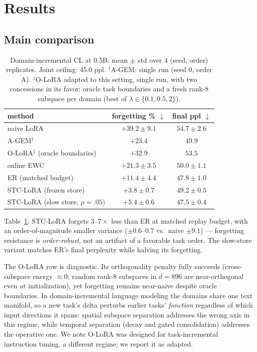 \documentclass{article}
\newcommand{\stc}{STC-LoRA}
\newcommand{\best}[1]{\bm{#1}}   %
\begin{document}
\section{Results}\label{sec:results}

\subsection{Main comparison}
\begin{table}[t]
\centering\small
\caption{Domain-incremental CL at 0.5B: mean $\pm$ std over 4 (seed, order) replicates. Joint ceiling: 45.0 ppl. $^{\dagger}$A-GEM: single run (seed 0, order A). $^{\ddagger}$O-LoRA \citep{wang2023orthogonal} adapted to this setting, single run, with two concessions in its favor: oracle task boundaries and a fresh rank-8 subspace per domain (best of $\lambda\in\{0.1,0.5,2\}$).}
\label{tab:main}
\begin{tabular}{lcc}
\toprule
method & forgetting \% $\downarrow$ & final ppl $\downarrow$ \\
\midrule
naive LoRA & $+39.2 \pm 9.1$ & $54.7 \pm 2.6$ \\
A-GEM$^{\dagger}$ & $+23.4$ & $49.9$ \\
O-LoRA$^{\ddagger}$ (oracle boundaries) & $+32.9$ & $53.5$ \\
online EWC & $+21.3 \pm 3.5$ & $50.0 \pm 1.1$ \\
ER (matched budget) & $+11.4 \pm 4.4$ & $47.8 \pm 1.0$ \\
\midrule
\stc{} (frozen store) & $\best{+3.8 \pm 0.7}$ & $49.2 \pm 0.5$ \\
\stc{} (slow store, $\rho{=}.05$) & $+5.4 \pm 0.6$ & $\best{47.5 \pm 0.4}$ \\
\bottomrule
\end{tabular}
\end{table}

Table~\ref{tab:main}: \stc{} forgets $3$--$7\times$ less than ER at matched replay budget, with an order-of-magnitude smaller variance ($\pm0.6$--$0.7$ vs.\ naive $\pm9.1$) --- forgetting resistance is \emph{order-robust}, not an artifact of a favorable task order. The slow-store variant matches ER's final perplexity while halving its forgetting.

The O-LoRA row is diagnostic. Its orthogonality penalty fully succeeds (cross-subspace energy ${\approx}0$; random rank-8 subspaces in $d{=}896$ are near-orthogonal even at initialization), yet forgetting remains near-naive despite oracle boundaries. In domain-incremental language modeling the domains share one text manifold, so a new task's delta perturbs earlier tasks' \emph{function} regardless of which input directions it spans: spatial subspace separation addresses the wrong axis in this regime, while temporal separation (decay and gated consolidation) addresses the operative one. We note O-LoRA was designed for task-incremental instruction tuning, a different regime; we report it as adapted.
\end{document}
